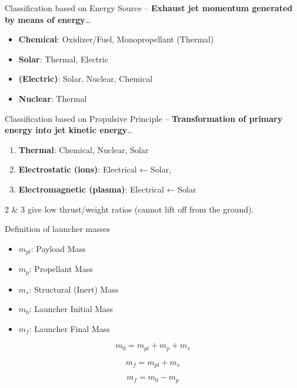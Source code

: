 \documentclass[
  ignorenonframetext,
]{beamer}
\providecommand{\tightlist}{%
  \setlength{\itemsep}{0pt}\setlength{\parskip}{0pt}}\usepackage{longtable,booktabs,array}
\begin{document}
\begin{frame}
\begin{block}{Classification based on Energy Source}
\protect\hypertarget{classification-based-on-energy-source}{}
-- \textbf{Exhaust jet momentum generated by means of energy}\ldots{}

\begin{itemize}
\tightlist
\item
  \textbf{Chemical}: Oxidizer/Fuel, Monopropellant (Thermal)
\item
  \textbf{Solar}: Thermal, Electric
\item
  \textbf{(Electric)}: Solar, Nuclear, Chemical
\item
  \textbf{Nuclear}: Thermal
\end{itemize}
\end{block}

\begin{block}{Classification based on Propulsive Principle}
\protect\hypertarget{classification-based-on-propulsive-principle}{}
-- \textbf{Transformation of primary energy into jet kinetic
energy}\ldots{}

\begin{enumerate}
\tightlist
\item
  \textbf{Thermal}: Chemical, Nuclear, Solar\\
\item
  \textbf{Electrostatic (ions)}: Electrical ← Solar,
\item
  \textbf{Electromagnetic (plasma)}: Electrical ← Solar
\end{enumerate}

2 \& 3 give low thrust/weight ratios (cannot lift off from the ground).
\end{block}
\end{frame}

\begin{frame}{Definition of launcher masses}
\protect\hypertarget{definition-of-launcher-masses}{}
\begin{itemize}
\tightlist
\item
  \textbf{\(m_{pl}\)}: Payload Mass
\item
  \textbf{\(m_p\)}: Propellant Mass
\item
  \textbf{\(m_s\)}: Structural (Inert) Mass
\item
  \textbf{\(m_0\)}: Launcher Initial Mass
\item
  \textbf{\(m_f\)}: Launcher Final Mass
\end{itemize}

\[m_0 = m_{pl} + m_p + m_s\]

\[m_f = m_{pl} + m_s\]

\[m_f = m_0 - m_p\]
\end{frame}
\end{document}
